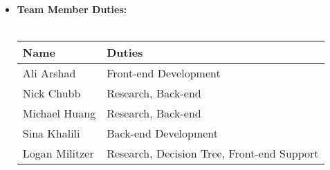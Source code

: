 \documentclass{article}
\begin{document}
\begin{itemize}
    \item \textbf{Team Member Duties:} \\ \\
        \begin{tabularx}{\linewidth}{
        |p{}%
        |p{}|}
        \hline
        \textbf{Name} & \textbf{Duties} \\
        \hline
        Ali Arshad & Front-end Development \\
        \hline
        Nick Chubb & Research, Back-end \\ 
        \hline
        Michael Huang & Research, Back-end \\
        \hline
        Sina Khalili &  Back-end Development\\
        \hline
        Logan Militzer & Research, Decision Tree, Front-end Support \\
        \hline
        \end{tabularx} \\
    

\end{itemize}
\end{document}
